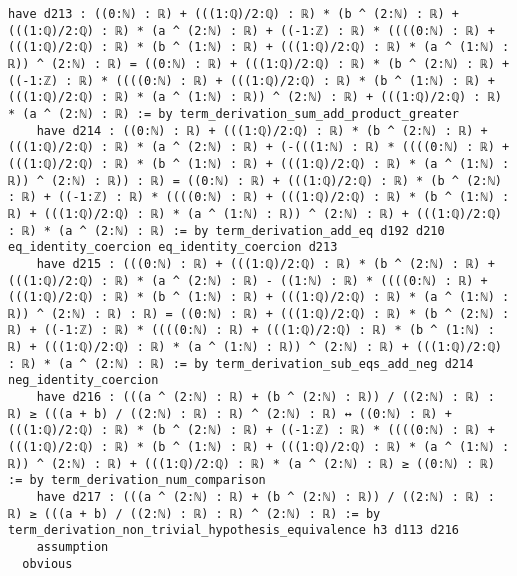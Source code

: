 \documentclass{article}
\begin{document}
\begin{tcolorbox}[colback=white!10, width=\linewidth]
\begin{lstlisting}[language=Lean4]
    have d213 : ((0:ℕ) : ℝ) + (((1:ℚ)/2:ℚ) : ℝ) * (b ^ (2:ℕ) : ℝ) + (((1:ℚ)/2:ℚ) : ℝ) * (a ^ (2:ℕ) : ℝ) + ((-1:ℤ) : ℝ) * ((((0:ℕ) : ℝ) + (((1:ℚ)/2:ℚ) : ℝ) * (b ^ (1:ℕ) : ℝ) + (((1:ℚ)/2:ℚ) : ℝ) * (a ^ (1:ℕ) : ℝ)) ^ (2:ℕ) : ℝ) = ((0:ℕ) : ℝ) + (((1:ℚ)/2:ℚ) : ℝ) * (b ^ (2:ℕ) : ℝ) + ((-1:ℤ) : ℝ) * ((((0:ℕ) : ℝ) + (((1:ℚ)/2:ℚ) : ℝ) * (b ^ (1:ℕ) : ℝ) + (((1:ℚ)/2:ℚ) : ℝ) * (a ^ (1:ℕ) : ℝ)) ^ (2:ℕ) : ℝ) + (((1:ℚ)/2:ℚ) : ℝ) * (a ^ (2:ℕ) : ℝ) := by term_derivation_sum_add_product_greater
    have d214 : ((0:ℕ) : ℝ) + (((1:ℚ)/2:ℚ) : ℝ) * (b ^ (2:ℕ) : ℝ) + (((1:ℚ)/2:ℚ) : ℝ) * (a ^ (2:ℕ) : ℝ) + (-(((1:ℕ) : ℝ) * ((((0:ℕ) : ℝ) + (((1:ℚ)/2:ℚ) : ℝ) * (b ^ (1:ℕ) : ℝ) + (((1:ℚ)/2:ℚ) : ℝ) * (a ^ (1:ℕ) : ℝ)) ^ (2:ℕ) : ℝ)) : ℝ) = ((0:ℕ) : ℝ) + (((1:ℚ)/2:ℚ) : ℝ) * (b ^ (2:ℕ) : ℝ) + ((-1:ℤ) : ℝ) * ((((0:ℕ) : ℝ) + (((1:ℚ)/2:ℚ) : ℝ) * (b ^ (1:ℕ) : ℝ) + (((1:ℚ)/2:ℚ) : ℝ) * (a ^ (1:ℕ) : ℝ)) ^ (2:ℕ) : ℝ) + (((1:ℚ)/2:ℚ) : ℝ) * (a ^ (2:ℕ) : ℝ) := by term_derivation_add_eq d192 d210 eq_identity_coercion eq_identity_coercion d213
    have d215 : (((0:ℕ) : ℝ) + (((1:ℚ)/2:ℚ) : ℝ) * (b ^ (2:ℕ) : ℝ) + (((1:ℚ)/2:ℚ) : ℝ) * (a ^ (2:ℕ) : ℝ) - ((1:ℕ) : ℝ) * ((((0:ℕ) : ℝ) + (((1:ℚ)/2:ℚ) : ℝ) * (b ^ (1:ℕ) : ℝ) + (((1:ℚ)/2:ℚ) : ℝ) * (a ^ (1:ℕ) : ℝ)) ^ (2:ℕ) : ℝ) : ℝ) = ((0:ℕ) : ℝ) + (((1:ℚ)/2:ℚ) : ℝ) * (b ^ (2:ℕ) : ℝ) + ((-1:ℤ) : ℝ) * ((((0:ℕ) : ℝ) + (((1:ℚ)/2:ℚ) : ℝ) * (b ^ (1:ℕ) : ℝ) + (((1:ℚ)/2:ℚ) : ℝ) * (a ^ (1:ℕ) : ℝ)) ^ (2:ℕ) : ℝ) + (((1:ℚ)/2:ℚ) : ℝ) * (a ^ (2:ℕ) : ℝ) := by term_derivation_sub_eqs_add_neg d214 neg_identity_coercion
    have d216 : (((a ^ (2:ℕ) : ℝ) + (b ^ (2:ℕ) : ℝ)) / ((2:ℕ) : ℝ) : ℝ) ≥ (((a + b) / ((2:ℕ) : ℝ) : ℝ) ^ (2:ℕ) : ℝ) ↔ ((0:ℕ) : ℝ) + (((1:ℚ)/2:ℚ) : ℝ) * (b ^ (2:ℕ) : ℝ) + ((-1:ℤ) : ℝ) * ((((0:ℕ) : ℝ) + (((1:ℚ)/2:ℚ) : ℝ) * (b ^ (1:ℕ) : ℝ) + (((1:ℚ)/2:ℚ) : ℝ) * (a ^ (1:ℕ) : ℝ)) ^ (2:ℕ) : ℝ) + (((1:ℚ)/2:ℚ) : ℝ) * (a ^ (2:ℕ) : ℝ) ≥ ((0:ℕ) : ℝ) := by term_derivation_num_comparison
    have d217 : (((a ^ (2:ℕ) : ℝ) + (b ^ (2:ℕ) : ℝ)) / ((2:ℕ) : ℝ) : ℝ) ≥ (((a + b) / ((2:ℕ) : ℝ) : ℝ) ^ (2:ℕ) : ℝ) := by term_derivation_non_trivial_hypothesis_equivalence h3 d113 d216
    assumption
  obvious

\end{lstlisting}
\end{tcolorbox}
\end{document}
